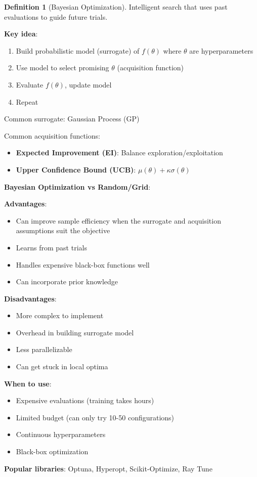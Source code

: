 \documentclass[11pt,twoside]{article}
\numberwithin{equation}{section}
\theoremstyle{plain}
\theoremstyle{definition}
\newtheorem{definition}[theorem]{Definition}
\theoremstyle{remark}
\newenvironment{keyidea}{
  \begin{tcolorbox}[colback=yellow!5!white,
                    colframe=yellow!50!black,
                    title=Key Idea,
                    breakable,
                    enhanced,
                    sharp corners,
                    boxrule=0.8pt,
                    left=6pt, right=6pt, top=6pt, bottom=6pt]
}{
  \end{tcolorbox}
}
\begin{document}
\begin{definition}[Bayesian Optimization]
Intelligent search that uses past evaluations to guide future trials.

\textbf{Key idea}:
\begin{enumerate}
\item Build probabilistic model (surrogate) of $f(\theta)$ where $\theta$ are hyperparameters
\item Use model to select promising $\theta$ (acquisition function)
\item Evaluate $f(\theta)$, update model
\item Repeat
\end{enumerate}

Common surrogate: Gaussian Process (GP)

Common acquisition functions:
\begin{itemize}
\item \textbf{Expected Improvement (EI)}: Balance exploration/exploitation
\item \textbf{Upper Confidence Bound (UCB)}: $\mu(\theta) + \kappa\sigma(\theta)$
\end{itemize}
\end{definition}

\begin{keyidea}
\textbf{Bayesian Optimization vs Random/Grid}:

\textbf{Advantages}:
\begin{itemize}
\item Can improve sample efficiency when the surrogate and acquisition assumptions suit the objective
\item Learns from past trials
\item Handles expensive black-box functions well
\item Can incorporate prior knowledge
\end{itemize}

\textbf{Disadvantages}:
\begin{itemize}
\item More complex to implement
\item Overhead in building surrogate model
\item Less parallelizable
\item Can get stuck in local optima
\end{itemize}

\textbf{When to use}:
\begin{itemize}
\item Expensive evaluations (training takes hours)
\item Limited budget (can only try 10-50 configurations)
\item Continuous hyperparameters
\item Black-box optimization
\end{itemize}

\textbf{Popular libraries}: Optuna, Hyperopt, Scikit-Optimize, Ray Tune
\end{keyidea}
\end{document}
